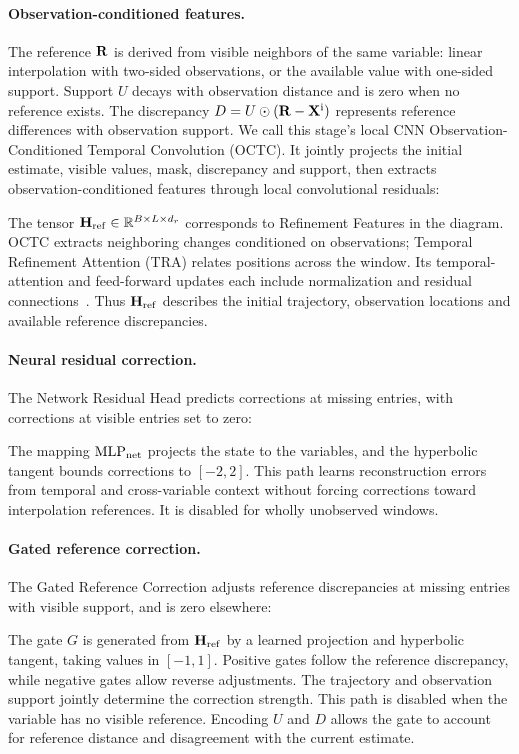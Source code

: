 \paragraph{Observation-conditioned features.}
The reference $\mathbf{R}$ is derived from visible neighbors of the same variable: linear interpolation with two-sided observations, or the available value with one-sided support. Support $U$ decays with observation distance and is zero when no reference exists. The discrepancy $D=U\odot(\mathbf{R}-\mathbf{X}^{\rm i})$ represents reference differences with observation support. We call this stage's local CNN Observation-Conditioned Temporal Convolution (OCTC). It jointly projects the initial estimate, visible values, mask, discrepancy and support, then extracts observation-conditioned features through local convolutional residuals:

The tensor $\mathbf H_{\rm ref}\in\mathbb R^{B\times L\times d_r}$ corresponds to Refinement Features in the diagram. OCTC extracts neighboring changes conditioned on observations; Temporal Refinement Attention (TRA) relates positions across the window. Its temporal-attention and feed-forward updates each include normalization and residual connections~\citep{attention}. Thus $\mathbf H_{\rm ref}$ describes the initial trajectory, observation locations and available reference discrepancies.

\paragraph{Neural residual correction.}
The Network Residual Head predicts corrections at missing entries, with corrections at visible entries set to zero:

The mapping $\operatorname{MLP}_{\rm net}$ projects the state to the variables, and the hyperbolic tangent bounds corrections to $[-2,2]$. This path learns reconstruction errors from temporal and cross-variable context without forcing corrections toward interpolation references. It is disabled for wholly unobserved windows.

\paragraph{Gated reference correction.}
The Gated Reference Correction adjusts reference discrepancies at missing entries with visible support, and is zero elsewhere:

The gate $G$ is generated from $\mathbf H_{\rm ref}$ by a learned projection and hyperbolic tangent, taking values in $[-1,1]$. Positive gates follow the reference discrepancy, while negative gates allow reverse adjustments. The trajectory and observation support jointly determine the correction strength. This path is disabled when the variable has no visible reference. Encoding $U$ and $D$ allows the gate to account for reference distance and disagreement with the current estimate.

